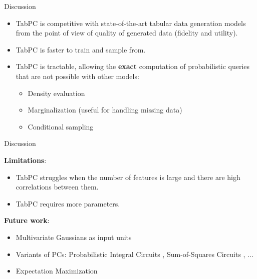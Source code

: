 \begin{frame}[fragile]{Discussion}

    \begin{itemize}
        \item TabPC is competitive with state-of-the-art tabular data generation models from the point of view of quality of generated data (fidelity and utility).
        \item TabPC is faster to train and sample from.
        \item TabPC is tractable, allowing the \textbf{exact} computation of probabilistic queries that are not possible with other models:
        \begin{itemize}
            \item Density evaluation
            \item Marginalization (useful for handling missing data)
            \item Conditional sampling
        \end{itemize} 
    \end{itemize}

\end{frame}

\begin{frame}[fragile]{Discussion}

    \textbf{Limitations}:
    \begin{itemize}
        \item TabPC struggles when the number of features is large and there are high correlations between them.
        \item TabPC requires more parameters.
    \end{itemize}

    \textbf{Future work}:
    \begin{itemize}
        \item Multivariate Gaussians as input units
        \item Variants of PCs: Probabilistic Integral Circuits \citep{gala2024probabilistic},  Sum-of-Squares Circuits \citep{loconte2025sum}, ...
        \item Expectation Maximization
    \end{itemize}

\end{frame}
